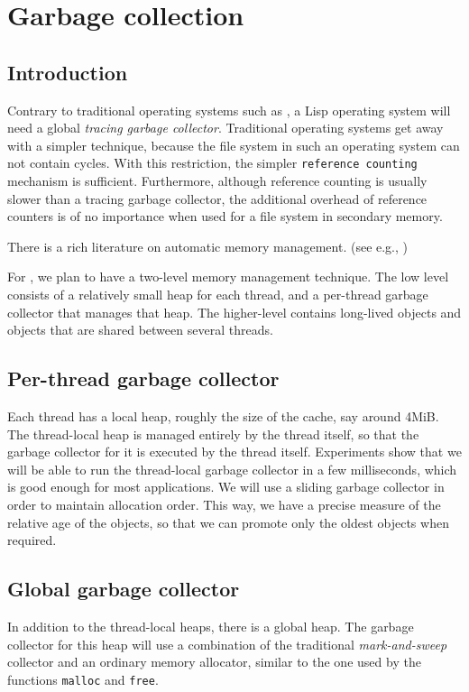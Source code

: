 \chapter{Garbage collection}
\label{chap-garbage-collection}

\section{Introduction}

Contrary to traditional operating systems such as \unix{}, a Lisp
operating system will need a global \emph{tracing garbage collector}.
Traditional operating systems get away with a simpler technique,
because the file system in such an operating system can not contain
cycles.  With this restriction, the simpler \texttt{reference
  counting} mechanism is sufficient.  Furthermore, although reference
counting is usually slower than a tracing garbage collector, the
additional overhead of reference counters is of no importance when
used for a file system in secondary memory.

There is a rich literature on automatic memory management.
(see e.g., \cite{Jones:2011:GCH:2025255})

For \sysname{}, we plan to have a two-level memory management
technique.  The low level consists of a relatively small heap for each
thread, and a per-thread garbage collector that manages that heap.
The higher-level contains long-lived objects and objects that are
shared between several threads.

\section{Per-thread garbage collector}

Each thread has a local heap, roughly the size of the cache, say
around 4MiB.  The thread-local heap is managed entirely by the thread
itself, so that the garbage collector for it is executed by the thread
itself.  Experiments show that we will be able to run the thread-local
garbage collector in a few milliseconds, which is good enough for most
applications.  We will use a sliding garbage collector in order to
maintain allocation order.  This way, we have a precise measure of the
relative age of the objects, so that we can promote only the oldest
objects when required. 

\section{Global garbage collector}

In addition to the thread-local heaps, there is a global heap.  The
garbage collector for this heap will use a combination of the
traditional \emph{mark-and-sweep} collector and an ordinary memory
allocator, similar to the one used by the \clanguage{} functions
\texttt{malloc} and \texttt{free}.
